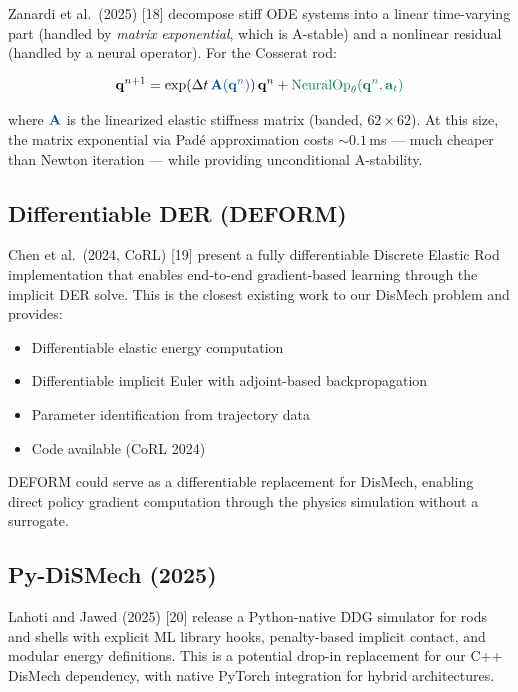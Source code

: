 \documentclass[11pt]{article}
\newcommand{\vect}[1]{\mathbf{#1}}
\newcommand{\mat}[1]{\mathbf{#1}}
\newcommand{\phys}[1]{{\color{physicsblue}#1}}
\newcommand{\nn}[1]{{\color{nngreen}#1}}
\begin{document}
Zanardi et al.\ (2025) [18] decompose stiff ODE systems into a linear time-varying part (handled by \emph{matrix exponential}, which is A-stable) and a nonlinear residual (handled by a neural operator).
For the Cosserat rod:

\begin{equation}
  \vect{q}^{n+1} = \exp(\Delta t\,\phys{\mat{A}(\vect{q}^n)})\,\vect{q}^n + \nn{\text{NeuralOp}_\theta(\vect{q}^n, \vect{a}_t)}
  \label{eq:meno}
\end{equation}

\noindent
where $\phys{\mat{A}}$ is the linearized elastic stiffness matrix (banded, $62 \times 62$).
At this size, the matrix exponential via Pad\'{e} approximation costs ${\sim}0.1$\,ms --- much cheaper than Newton iteration --- while providing unconditional A-stability.

\subsection{Differentiable DER (DEFORM)}

Chen et al.\ (2024, CoRL) [19] present a fully differentiable Discrete Elastic Rod implementation that enables end-to-end gradient-based learning through the implicit DER solve.
This is the closest existing work to our DisMech problem and provides:

\begin{itemize}
  \item Differentiable elastic energy computation
  \item Differentiable implicit Euler with adjoint-based backpropagation
  \item Parameter identification from trajectory data
  \item Code available (CoRL 2024)
\end{itemize}

\noindent
DEFORM could serve as a differentiable replacement for DisMech, enabling direct policy gradient computation through the physics simulation without a surrogate.

\subsection{Py-DiSMech (2025)}

Lahoti and Jawed (2025) [20] release a Python-native DDG simulator for rods and shells with explicit ML library hooks, penalty-based implicit contact, and modular energy definitions.
This is a potential drop-in replacement for our C++ DisMech dependency, with native PyTorch integration for hybrid architectures.
\end{document}
